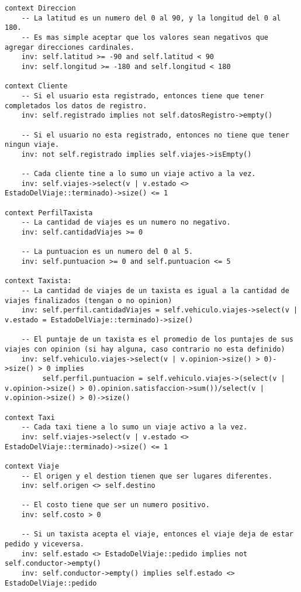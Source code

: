 \lstset{language=OCL}
\begin{lstlisting}[frame=single]
context Direccion
    -- La latitud es un numero del 0 al 90, y la longitud del 0 al 180.
    -- Es mas simple aceptar que los valores sean negativos que agregar direcciones cardinales.
    inv: self.latitud >= -90 and self.latitud < 90
    inv: self.longitud >= -180 and self.longitud < 180
    
context Cliente
    -- Si el usuario esta registrado, entonces tiene que tener completados los datos de registro.
    inv: self.registrado implies not self.datosRegistro->empty()

    -- Si el usuario no esta registrado, entonces no tiene que tener ningun viaje.
    inv: not self.registrado implies self.viajes->isEmpty()

    -- Cada cliente tine a lo sumo un viaje activo a la vez.
    inv: self.viajes->select(v | v.estado <> EstadoDelViaje::terminado)->size() <= 1
       
context PerfilTaxista
    -- La cantidad de viajes es un numero no negativo.
    inv: self.cantidadViajes >= 0

    -- La puntuacion es un numero del 0 al 5.
    inv: self.puntuacion >= 0 and self.puntuacion <= 5

context Taxista:
    -- La cantidad de viajes de un taxista es igual a la cantidad de viajes finalizados (tengan o no opinion)
    inv: self.perfil.cantidadViajes = self.vehiculo.viajes->select(v | v.estado = EstadoDelViaje::terminado)->size()

    -- El puntaje de un taxista es el promedio de los puntajes de sus viajes con opinion (si hay alguna, caso contrario no esta definido)
    inv: self.vehiculo.viajes->select(v | v.opinion->size() > 0)->size() > 0 implies
         self.perfil.puntuacion = self.vehiculo.viajes->(select(v | v.opinion->size() > 0).opinion.satisfaccion->sum())/select(v | v.opinion->size() > 0)->size()

context Taxi
    -- Cada taxi tiene a lo sumo un viaje activo a la vez.
	inv: self.viajes->select(v | v.estado <> EstadoDelViaje::terminado)->size() <= 1

context Viaje
    -- El origen y el destion tienen que ser lugares diferentes.
	inv: self.origen <> self.destino

    -- El costo tiene que ser un numero positivo.
    inv: self.costo > 0

    -- Si un taxista acepta el viaje, entonces el viaje deja de estar pedido y viceversa.
    inv: self.estado <> EstadoDelViaje::pedido implies not self.conductor->empty()
    inv: self.conductor->empty() implies self.estado <> EstadoDelViaje::pedido


\end{lstlisting}
